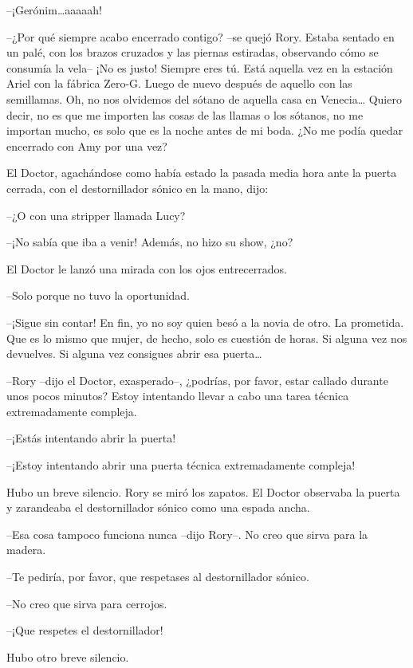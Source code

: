 {--¡Gerónim\ldots{}aaaaah!}

\mbox{}

{--¿Por qué siempre acabo encerrado contigo? --se quejó Rory. Estaba
	sentado en un palé, con los brazos cruzados y las piernas estiradas,
	observando cómo se consumía la vela-- ¡No es justo! Siempre eres tú.
	Está aquella vez en la estación Ariel con la fábrica Zero-G. Luego de
	nuevo después de aquello con las semillamas. Oh, no nos olvidemos del
	sótano de aquella casa en Venecia\ldots{} Quiero decir, no es que me
	importen las cosas de las llamas o los sótanos, no me importan mucho, es
	solo que es la noche antes de mi boda. ¿No me podía quedar encerrado con
Amy por una vez?}

{El Doctor, agachándose como había estado la pasada media hora ante la
puerta cerrada, con el destornillador sónico en la mano, dijo:}

{--¿O con una stripper llamada Lucy?}

{--¡No sabía que iba a venir! Además, no hizo su show, ¿no?}

{El Doctor le lanzó una mirada con los ojos entrecerrados.}

{--Solo porque no tuvo la oportunidad.}

{--¡Sigue sin contar! En fin, yo no soy quien besó a la novia de otro.
	La prometida. Que es lo mismo que mujer, de hecho, solo es cuestión de
	horas. Si alguna vez nos devuelves. Si alguna vez consigues abrir esa
	puerta\ldots{}}

{--Rory --dijo el Doctor, exasperado--, ¿podrías, por favor, estar
	callado durante unos pocos minutos? Estoy intentando llevar a cabo una
tarea técnica extremadamente compleja.}

{--¡Estás intentando abrir la puerta!}

{--¡Estoy intentando abrir una puerta técnica extremadamente
compleja!}

{Hubo un breve silencio. Rory se miró los zapatos. El Doctor observaba
la puerta y zarandeaba el destornillador sónico como una espada ancha.}

{--Esa cosa tampoco funciona nunca --dijo Rory--. No creo que sirva
para la madera.}

{--Te pediría, por favor, que respetases al destornillador sónico.}

{--No creo que sirva para cerrojos.}

{--¡Que respetes el destornillador!}

{Hubo otro breve silencio.}

